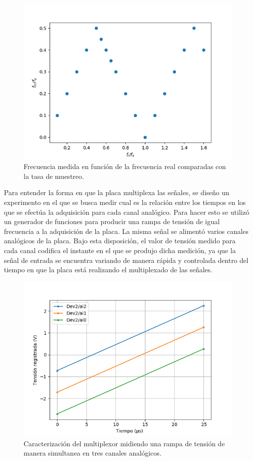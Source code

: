 \documentclass[a4paper,11pt]{article}
\begin{document}
\begin{figure}[!ht]
\centering
\includegraphics[width=\textwidth]{figs/alliasing.png}
\caption{Frecuencia medida en función de la frecuencia real comparadas con la tasa de muestreo.}
\label{fig:aliasing}
\end{figure}

Para entender la forma en que la placa multiplexa las señales, se diseño un experimento en el que se busca medir cual es la relación entre los tiempos en los que se efectúa la adquisición para cada canal analógico. Para hacer esto se utilizó un generador de funciones para producir una rampa de tensión de igual frecuencia a la adquisición de la placa. La misma señal se alimentó varios canales analógicos de la placa. Bajo esta disposición, el valor de tensión medido para cada canal codifica el instante en el que se produjo dicha medición, ya que la señal de entrada se encuentra variando de manera rápida y controlada dentro del tiempo en que la placa está realizando el multiplexado de las señales. 

\begin{figure}[!ht]
\centering
\includegraphics[width=\textwidth]{figs/multiplex.png}
\caption{Caracterización del multiplexor midiendo una rampa de tensión de manera simultanea en tres canales analógicos.}
\label{fig:multiplex}
\end{figure}
\end{document}
